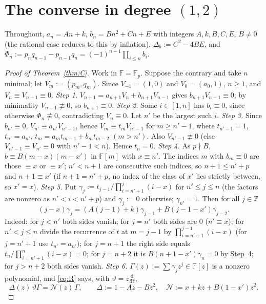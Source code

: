 \documentclass[11pt]{amsart}
\theoremstyle{definition}
\theoremstyle{remark}
\numberwithin{equation}{section}
\newcommand{\Z}{\mathbb{Z}}
\newcommand{\F}{\mathbb{F}}
\begin{document}
\section{\texorpdfstring{The converse in degree $(1,2)$}{The converse in degree (1,2)}}

Throughout, $a_n=An+k$, $b_n=Bn^2+Cn+E$ with integers $A,k,B,C,E$, $B\neq0$ (the rational case reduces to this by inflation), $\Delta_b:=C^2-4BE$, and $\Phi_n:=p_nq_{n-1}-p_{n-1}q_n=(-1)^{n-1}\prod_{i\le n}b_i$.

\begin{proof}[Proof of Theorem~\ref{thm:C}]
Work in $\F=\F_p$. Suppose the contrary and take $n$ minimal; let $V_m:=(p_m,q_m)$. Since $V_{-1}=(1,0)$ and $V_0=(a_0,1)$, $n\ge1$, and $V_n\equiv V_{n+1}\equiv0$.
\emph{Step 1.} $V_{n+1}=a_{n+1}V_n+b_{n+1}V_{n-1}$ gives $b_{n+1}V_{n-1}\equiv0$; by minimality $V_{n-1}\not\equiv0$, so $b_{n+1}\equiv0$.
\emph{Step 2.} Some $i\in[1,n]$ has $b_i\equiv0$, since otherwise $\Phi_n\not\equiv0$, contradicting $V_n\equiv0$. Let $n'$ be the largest such $i$.
\emph{Step 3.} Since $b_{n'}\equiv0$, $V_{n'}\equiv a_{n'}V_{n'-1}$, hence $V_m\equiv t_mV_{n'-1}$ for $m\ge n'-1$, where $t_{n'-1}=1$, $t_{n'}=a_{n'}$, $t_m=a_mt_{m-1}+b_mt_{m-2}$ $(m>n')$. Also $V_{n'-1}\not\equiv0$ (else $V_{n'-1}\equiv V_{n'}\equiv0$ with $n'-1<n$). Hence $t_n=0$.
\emph{Step 4.} As $p\nmid B$, $b\equiv B(m-x)(m-x')$ in $\F[m]$ with $x\equiv n'$. The indices $m$ with $b_m\equiv0$ are those $\equiv x$ or $\equiv x'$; $n'<n+1$ are consecutive such indices, so $n+1\le n'+p$ and $n+1\equiv x'$ (if $n+1=n'+p$, no index of the class of $x'$ lies strictly between, so $x'=x$).
\emph{Step 5.} Put $\gamma_j:=t_{j-1}/\prod_{i=n'+1}^j(i-x)$ for $n'\le j\le n$ (the factors are nonzero as $n'<i<n'+p$) and $\gamma_j:=0$ otherwise; $\gamma_{n'}=1$. Then for all $j\in\Z$
\begin{equation}\label{eq:R}
(j-x)\gamma_j=(A(j-1)+k)\gamma_{j-1}+B(j-1-x')\gamma_{j-2}.
\end{equation}
Indeed: for $j<n'$ both sides vanish; for $j=n'$ both sides are $0$ ($n'\equiv x$); for $n'<j\le n$ divide the recurrence of $t$ at $m=j-1$ by $\prod_{i=n'+1}^{j-1}(i-x)$ (for $j=n'+1$ use $t_{n'}=a_{n'}$); for $j=n+1$ the right side equals $t_n/\prod_{i=n'+1}^n(i-x)=0$; for $j=n+2$ it is $B(n+1-x')\gamma_n=0$ by Step~4; for $j>n+2$ both sides vanish.
\emph{Step 6.} $\Gamma(z):=\sum\gamma_jz^j\in\F[z]$ is a nonzero polynomial, and \eqref{eq:R} says, with $\vartheta=z\frac{\mathrm d}{\mathrm dz}$,
\[
\Delta(z)\,\vartheta\Gamma=\mathcal N(z)\,\Gamma,\qquad\Delta:=1-Az-Bz^2,\quad\mathcal N:=x+kz+B(1-x')z^2 .
\]
\end{proof}
\end{document}
